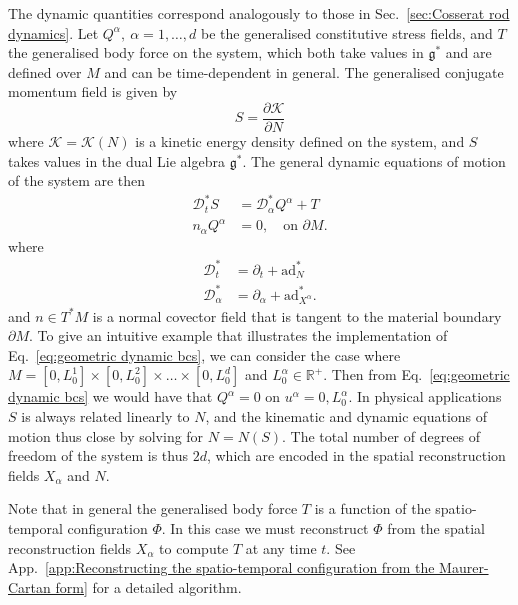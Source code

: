 The dynamic quantities correspond analogously to those in Sec.~\ref{sec:Cosserat rod dynamics}. Let $Q^\alpha,\ \alpha = 1, \dots, d$ be the generalised constitutive stress fields, and $T$ the generalised body force on the system, which both take values in $\mathfrak{g}^*$ and are defined over $M$ and can be time-dependent in general. The generalised conjugate momentum field is given by
\begin{equation} \label{eq:(summary) generalised conjguate momentum}
S = \frac{\partial \mathcal{K}}{\partial N}
\end{equation}
where $\mathcal{K} = \mathcal{K}(N)$ is a kinetic energy density defined on the system, and $S$ takes values in the dual Lie algebra $\mathfrak{g}^*$. The general dynamic equations of motion of the system are then
\begin{subequations} \label{eq:(summary) dynamical equations of motion}
\begin{align}
\mathcal{D}^*_t S & = \mathcal{D}^*_\alpha Q^\alpha + T \\
n_\alpha Q^\alpha & = 0, \quad \text{on } \partial M. \label{eq:geometric dynamic bcs}
\end{align}
\end{subequations}
where
\begin{subequations}
\begin{align}
\mathcal{D}^*_t & = \partial_t + \text{ad}_N^* \\
\mathcal{D}^*_\alpha & = \partial_\alpha + \text{ad}_{X^\alpha}^*.
\end{align}
\end{subequations}
and $n \in T^*M$ is a normal covector field that is tangent to the material boundary $\partial M$. To give an intuitive example that illustrates the implementation of Eq.~\ref{eq:geometric dynamic bcs}, we can consider the case where $M = [0, L_0^1] \times [0, L_0^2] \times \dots \times [0, L_0^d]$ and $L_0^\alpha \in \mathbb{R}^+$. Then from Eq.~\ref{eq:geometric dynamic bcs} we would have that $Q^\alpha = 0$ on $u^\alpha = 0, L^\alpha_0$. In physical applications $S$ is always related linearly to $N$, and the kinematic and dynamic equations of motion thus close by solving for $N = N(S)$. The total number of degrees of freedom of the system is thus $2d$, which are encoded in the spatial reconstruction fields $X_\alpha$ and $N$.

Note that in general the generalised body force $T$ is a function of the spatio-temporal configuration $\Phi$. In this case we must reconstruct $\Phi$ from the spatial reconstruction fields $X_\alpha$ to compute $T$ at any time $t$. See App.~\ref{app:Reconstructing the spatio-temporal configuration from the Maurer-Cartan form} for a detailed algorithm.

